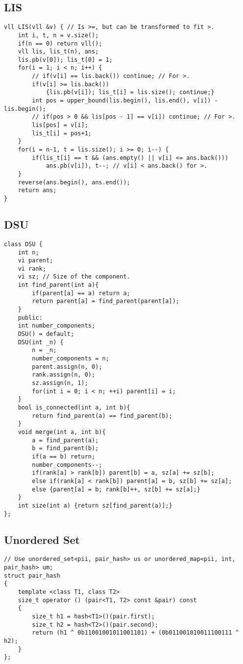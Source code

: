 \documentclass[a4paper]{article}
\begin{document}
\subsection*{LIS}
\begin{verbatim}
vll LIS(vll &v) { // Is >=, but can be transformed to fit >.
    int i, t, n = v.size();
    if(n == 0) return vll();
    vll lis, lis_t(n), ans;
    lis.pb(v[0]); lis_t[0] = 1;
    for(i = 1; i < n; i++) {
        // if(v[i] == lis.back()) continue; // For >.
        if(v[i] >= lis.back())
            {lis.pb(v[i]); lis_t[i] = lis.size(); continue;}
        int pos = upper_bound(lis.begin(), lis.end(), v[i]) - lis.begin();
        // if(pos > 0 && lis[pos - 1] == v[i]) continue; // For >.
        lis[pos] = v[i];
        lis_t[i] = pos+1;
    }
    for(i = n-1, t = lis.size(); i >= 0; i--) {
        if(lis_t[i] == t && (ans.empty() || v[i] <= ans.back()))
            ans.pb(v[i]), t--; // v[i] < ans.back() for >.
    }
    reverse(ans.begin(), ans.end());
    return ans;
}
\end{verbatim}
\subsection*{DSU}
\begin{multicols}{2}
\begin{verbatim}
class DSU {
    int n;
    vi parent;
    vi rank;
    vi sz; // Size of the component.
    int find_parent(int a){
        if(parent[a] == a) return a;
        return parent[a] = find_parent(parent[a]);
    }
    public:
    int number_components;
    DSU() = default;
    DSU(int _n) {
        n = _n;
        number_components = n;
        parent.assign(n, 0);
        rank.assign(n, 0);
        sz.assign(n, 1);
        for(int i = 0; i < n; ++i) parent[i] = i;
    }
    bool is_connected(int a, int b){
        return find_parent(a) == find_parent(b);
    }
    void merge(int a, int b){
        a = find_parent(a);
        b = find_parent(b);
        if(a == b) return;
        number_components--;
        if(rank[a] > rank[b]) parent[b] = a, sz[a] += sz[b];
        else if(rank[a] < rank[b]) parent[a] = b, sz[b] += sz[a];
        else {parent[a] = b; rank[b]++, sz[b] += sz[a];}
    }
    int size(int a) {return sz[find_parent(a)];}
};
\end{verbatim}
\end{multicols}
\subsection*{Unordered Set}
\begin{verbatim}
// Use unordered_set<pii, pair_hash> us or unordered_map<pii, int, pair_hash> um;
struct pair_hash
{
    template <class T1, class T2>
    size_t operator () (pair<T1, T2> const &pair) const
    {
        size_t h1 = hash<T1>()(pair.first);
        size_t h2 = hash<T2>()(pair.second);
        return (h1 ^ 0b11001001011001101) + (0b011001010011100111 ^ h2);
    }
};
\end{verbatim}
\end{document}
